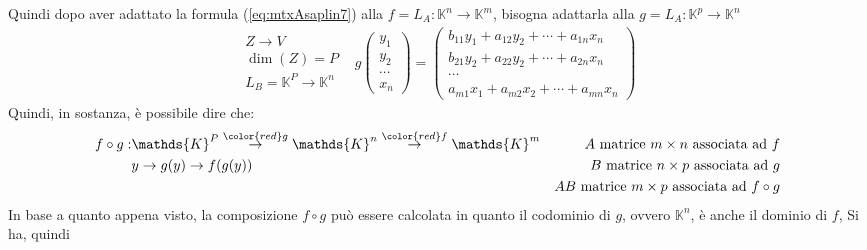 Quindi dopo aver adattato la formula (\ref{eq:mtxAsaplin7}) alla $f=L_A:\mathds{K}^n\to \mathds{K}^m$, bisogna adattarla
alla $g=L_A:\mathds{K}^p\to \mathds{K}^n$
\begin{eqnarray}
  \label{eq:Compinveeproddimatrici2}
  \begin{matrix}
    Z\to V\\
    \dim(Z)=P\\
    L_B=\mathds{K}^P\to \mathds{K}^n
  \end{matrix}
  & g
  \begin{pmatrix}
    y_1\\
    y_2\\
    \cdots\\
    x_n
  \end{pmatrix}=
  \begin{pmatrix}
    b_{11}y_1+a_{12}y_2+\cdots +a_{1n}x_n\\
    b_{21}y_2+a_{22}y_2+\cdots+ a_{2n}x_n\\
    \cdots\\
    a_{m1}x_1+a_{m2}x_2+\cdots+ a_{mn}x_n
  \end{pmatrix}
\end{eqnarray}
Quindi, in sostanza, è possibile dire che:
\begin{eqnarray*}
  f\circ g: & \mathds{K}^P\overset{\color{red}g}{\to} \mathds{K}^n\overset{\color{red}f}{\to}
              \mathds{K}^m & A \text{ matrice $m\times n$ associata ad } f\\
            & y\to g(y)\to f(g(y)) &  B \text{ matrice $n\times p$ associata ad } g\\
  &&  AB \text{ matrice $m\times p$ associata ad } f\circ g
\end{eqnarray*}
In base a quanto appena visto, la composizione $f\circ g$ può essere calcolata in quanto il codominio di
$g$, ovvero $\mathds{K}^n$, è anche il dominio di $f$, Si ha, quindi
